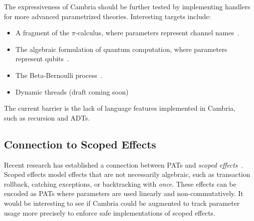\documentclass{article}
\theoremstyle{definition}
\theoremstyle{remark}
\begin{document}
The expressiveness of Cambria should be further tested by implementing handlers for more advanced parametrized theories.
Interesting targets include:
\begin{itemize}
  \item A fragment of the $\pi$-calculus, where parameters represent channel names~\cite{staton_instances_2013}.
  \item The algebraic formulation of quantum computation, where parameters represent qubits~\cite{staton_algebraic_2015}.
  \item The Beta-Bernoulli process~\cite{staton_beta_2018}.
  \item Dynamic threads (draft coming soon)
\end{itemize}
The current barrier is the lack of language features implemented in Cambria, such as recursion and ADTs.

\subsection{Connection to Scoped Effects}

Recent research has established a connection between PATs and \emph{scoped effects}~\cite{lindley_scoped_2024}.
Scoped effects model effects that are not necessarily algebraic, such as transaction rollback, catching exceptions, or backtracking with \emph{once}.
These effects can be encoded as PATs where parameters are used linearly and non-commutatively.
It would be interesting to see if Cambria could be augmented to track parameter usage more precisely to enforce safe implementations of scoped effects.



\end{document}

